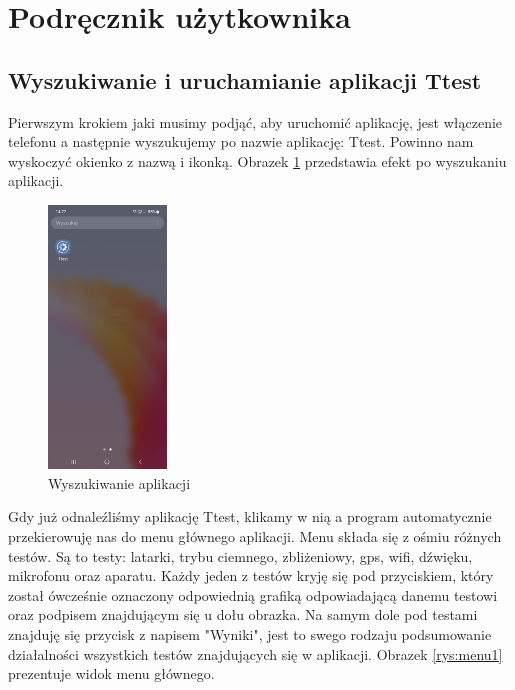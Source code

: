 	\newpage
\section{Podręcznik użytkownika}  %


\subsection{Wyszukiwanie i uruchamianie aplikacji Ttest} 

Pierwszym krokiem jaki musimy podjąć, aby uruchomić aplikację, jest włączenie telefonu a następnie wyszukujemy po nazwie aplikację: Ttest. Powinno nam wyskoczyć okienko z nazwą i ikonką.
\newline
Obrazek \ref{rys:ikonka} przedstawia efekt po wyszukaniu aplikacji.

\begin{figure}[!hbt]
	\begin{center}
		\includegraphics[angle=360, width=0.28\textwidth]{rys/punkt6/ikonka.jpg}
		\caption{Wyszukiwanie aplikacji}
		\label{rys:ikonka}
	\end{center}
\end{figure}

Gdy już odnaleźliśmy aplikację Ttest, klikamy w nią a program automatycznie przekierowuję nas do menu głównego aplikacji. Menu składa się z ośmiu różnych testów. Są to testy: latarki, trybu ciemnego, zbliżeniowy, gps, wifi, dźwięku, mikrofonu oraz aparatu. Każdy jeden z testów kryję się pod przyciskiem, który został ówcześnie oznaczony odpowiednią grafiką odpowiadającą danemu testowi oraz podpisem znajdującym się u dołu obrazka. Na samym dole pod testami znajduję się przycisk z napisem "Wyniki", jest to swego rodzaju podsumowanie działalności wszystkich testów znajdujących się w aplikacji.
\newline
Obrazek \ref{rys:menu1} prezentuje widok menu głównego.

